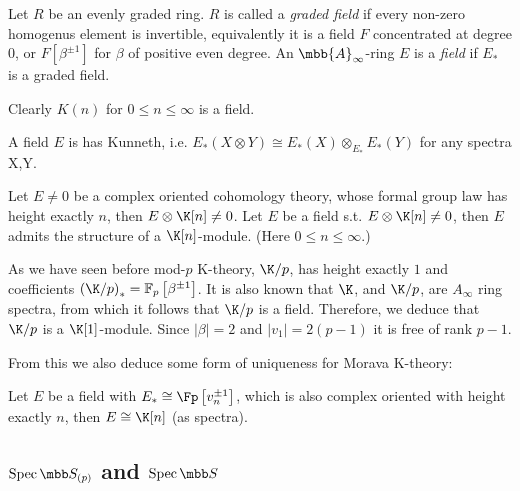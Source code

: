 \begin{definition}
	Let $R$ be an evenly graded ring.
	$R$ is called a \emph{graded field} if every non-zero homogenus element is invertible, equivalently it is a field $F$ concentrated at degree 0, or $F\left[\beta^{\pm1}\right]$ for $\beta$ of positive even degree.
	An $\mbb{A}_\infty$-ring $E$ is a \emph{field} if $E_*$ is a graded field.
\end{definition}

\begin{example}
	Clearly $K\left(n\right)$ for $0 \leq n \leq \infty$ is a field.
\end{example}

\begin{proposition}
	A field $E$ is has Kunneth, i.e. $E_*\left(X\otimes Y\right)\cong E_*\left(X\right)\otimes_{E_*}E_*\left(Y\right)$ for any spectra X,Y.
\end{proposition}

\begin{proposition}
	Let $E \neq 0$ be a complex oriented cohomology theory, whose formal group law has height exactly $n$, then $E \otimes \K[n] \neq 0$.
	Let $E$ be a field s.t. $E \otimes \K[n] \neq 0$, then $E$ admits the structure of a $\K[n]$-module.
	(Here $0 \leq n \leq \infty$.)
\end{proposition}

\begin{example}
	As we have seen before mod-$p$ K-theory, $\K/p$, has height exactly $1$ and coefficients $\left(\K/p\right)_* = \mathbb{F}_p \left[\beta^{\pm 1}\right]$.
	It is also known that $\K$, and $\K/p$, are $A_\infty$ ring spectra, from which it follows that $\K/p$ is a field.
	Therefore, we deduce that $\K/p$ is a $\K[1]$-module.
	Since $\left|\beta\right| = 2$ and $\left|v_1\right| = 2\left(p-1\right)$ it is free of rank $p-1$.
\end{example}

From this we also deduce some form of uniqueness for Morava K-theory:

\begin{corollary}
	Let $E$ be a field with $E_* \cong \Fp\left[v_n^{\pm 1}\right]$, which is also complex oriented with height exactly $n$, then $E \cong \K[n]$ (as spectra).
\end{corollary}



\subsection{\texorpdfstring{$\spec \SS_{\left(p\right)}$}{spec S(p)} and \texorpdfstring{$\spec \SS$}{spec S}}

